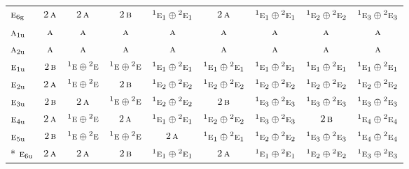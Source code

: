 \documentclass[10pt,a4paper]{article}
\numberwithin{equation}{section}
\newcommand{\irr}[1]{\text{\normalfont\scshape #1}}
\newcommand{\conjpair}[1]{{}^{#1}}
\newcommand{\ptag}[1]{\mathrm{#1}}
\begin{document}
{\begin{longtable}{@{}lcccccccc@{}}
$\irr{e}_{6\ptag{g}}$ & $2\,\irr{a}$ & $2\,\irr{a}$ & $2\,\irr{b}$ & $\conjpair{1}\irr{e}_{1}\oplus \conjpair{2}\irr{e}_{1}$ & $2\,\irr{a}$ & $\conjpair{1}\irr{e}_{1}\oplus \conjpair{2}\irr{e}_{1}$ & $\conjpair{1}\irr{e}_{2}\oplus \conjpair{2}\irr{e}_{2}$ & $\conjpair{1}\irr{e}_{3}\oplus \conjpair{2}\irr{e}_{3}$\\
$\irr{a}_{1\ptag{u}}$ & $\irr{a}$ & $\irr{a}$ & $\irr{a}$ & $\irr{a}$ & $\irr{a}$ & $\irr{a}$ & $\irr{a}$ & $\irr{a}$\\
$\irr{a}_{2\ptag{u}}$ & $\irr{a}$ & $\irr{a}$ & $\irr{a}$ & $\irr{a}$ & $\irr{a}$ & $\irr{a}$ & $\irr{a}$ & $\irr{a}$\\
$\irr{e}_{1\ptag{u}}$ & $2\,\irr{b}$ & $\conjpair{1}\irr{e}\oplus \conjpair{2}\irr{e}$ & $\conjpair{1}\irr{e}\oplus \conjpair{2}\irr{e}$ & $\conjpair{1}\irr{e}_{1}\oplus \conjpair{2}\irr{e}_{1}$ & $\conjpair{1}\irr{e}_{1}\oplus \conjpair{2}\irr{e}_{1}$ & $\conjpair{1}\irr{e}_{1}\oplus \conjpair{2}\irr{e}_{1}$ & $\conjpair{1}\irr{e}_{1}\oplus \conjpair{2}\irr{e}_{1}$ & $\conjpair{1}\irr{e}_{1}\oplus \conjpair{2}\irr{e}_{1}$\\
$\irr{e}_{2\ptag{u}}$ & $2\,\irr{a}$ & $\conjpair{1}\irr{e}\oplus \conjpair{2}\irr{e}$ & $2\,\irr{b}$ & $\conjpair{1}\irr{e}_{2}\oplus \conjpair{2}\irr{e}_{2}$ & $\conjpair{1}\irr{e}_{2}\oplus \conjpair{2}\irr{e}_{2}$ & $\conjpair{1}\irr{e}_{2}\oplus \conjpair{2}\irr{e}_{2}$ & $\conjpair{1}\irr{e}_{2}\oplus \conjpair{2}\irr{e}_{2}$ & $\conjpair{1}\irr{e}_{2}\oplus \conjpair{2}\irr{e}_{2}$\\
$\irr{e}_{3\ptag{u}}$ & $2\,\irr{b}$ & $2\,\irr{a}$ & $\conjpair{1}\irr{e}\oplus \conjpair{2}\irr{e}$ & $\conjpair{1}\irr{e}_{2}\oplus \conjpair{2}\irr{e}_{2}$ & $2\,\irr{b}$ & $\conjpair{1}\irr{e}_{3}\oplus \conjpair{2}\irr{e}_{3}$ & $\conjpair{1}\irr{e}_{3}\oplus \conjpair{2}\irr{e}_{3}$ & $\conjpair{1}\irr{e}_{3}\oplus \conjpair{2}\irr{e}_{3}$\\
$\irr{e}_{4\ptag{u}}$ & $2\,\irr{a}$ & $\conjpair{1}\irr{e}\oplus \conjpair{2}\irr{e}$ & $2\,\irr{a}$ & $\conjpair{1}\irr{e}_{1}\oplus \conjpair{2}\irr{e}_{1}$ & $\conjpair{1}\irr{e}_{2}\oplus \conjpair{2}\irr{e}_{2}$ & $\conjpair{1}\irr{e}_{3}\oplus \conjpair{2}\irr{e}_{3}$ & $2\,\irr{b}$ & $\conjpair{1}\irr{e}_{4}\oplus \conjpair{2}\irr{e}_{4}$\\
$\irr{e}_{5\ptag{u}}$ & $2\,\irr{b}$ & $\conjpair{1}\irr{e}\oplus \conjpair{2}\irr{e}$ & $\conjpair{1}\irr{e}\oplus \conjpair{2}\irr{e}$ & $2\,\irr{a}$ & $\conjpair{1}\irr{e}_{1}\oplus \conjpair{2}\irr{e}_{1}$ & $\conjpair{1}\irr{e}_{2}\oplus \conjpair{2}\irr{e}_{2}$ & $\conjpair{1}\irr{e}_{3}\oplus \conjpair{2}\irr{e}_{3}$ & $\conjpair{1}\irr{e}_{4}\oplus \conjpair{2}\irr{e}_{4}$\\*
$\irr{e}_{6\ptag{u}}$ & $2\,\irr{a}$ & $2\,\irr{a}$ & $2\,\irr{b}$ & $\conjpair{1}\irr{e}_{1}\oplus \conjpair{2}\irr{e}_{1}$ & $2\,\irr{a}$ & $\conjpair{1}\irr{e}_{1}\oplus \conjpair{2}\irr{e}_{1}$ & $\conjpair{1}\irr{e}_{2}\oplus \conjpair{2}\irr{e}_{2}$ & $\conjpair{1}\irr{e}_{3}\oplus \conjpair{2}\irr{e}_{3}$\\
\bottomrule\end{longtable}}
\end{document}
